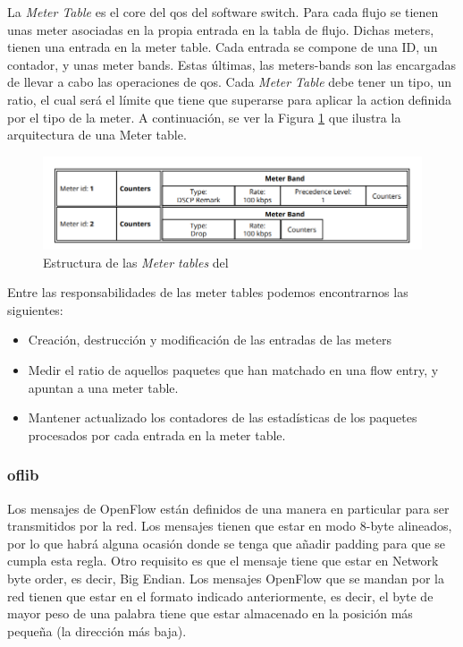 La \textit{Meter Table} es el core del \gls{qos} del software switch. Para cada flujo se tienen unas meter asociadas en la propia entrada en la tabla de flujo. Dichas meters, tienen una entrada en la meter table. Cada entrada se compone de una ID, un contador, y unas meter bands. Estas últimas, las meters-bands son las encargadas de llevar a cabo las operaciones de \gls{qos}. Cada \textit{Meter Table} debe tener un tipo, un ratio, el cual será el límite que tiene que superarse para aplicar la action definida por el tipo de la meter. A continuación, se ver la Figura \ref{fig:bofuss5} que ilustra la arquitectura de una Meter table.

\begin{figure}[ht]
    \centering
    \includegraphics[width=\textwidth]{archivos/img/teoria/bofuss5.png}
    \caption{Estructura de las \textit{Meter tables} del  \cite{fernandes2015software}}
    \label{fig:bofuss5}
\end{figure}

Entre las responsabilidades de las meter tables podemos encontrarnos las siguientes:

\begin{itemize}
    \item Creación, destrucción y modificación de las entradas de las meters
    \item Medir el ratio de aquellos paquetes que han matchado en una flow entry, y apuntan a una meter table.
    \item Mantener actualizado los contadores de las estadísticas de los paquetes procesados por cada entrada en la meter table.
\end{itemize}

\subsubsection{oflib}

Los mensajes de OpenFlow están definidos de una manera en particular para ser transmitidos por la red. Los mensajes tienen que estar en modo 8-byte alineados, por lo que habrá alguna ocasión donde se tenga que añadir padding para que se cumpla esta regla. Otro requisito es que el mensaje tiene que estar en Network byte order, es decir, Big Endian. Los mensajes OpenFlow que se mandan por la red tienen que estar en el formato indicado anteriormente, es decir, el byte de mayor peso de una palabra tiene que estar almacenado en la posición más pequeña (la dirección más baja).\\

